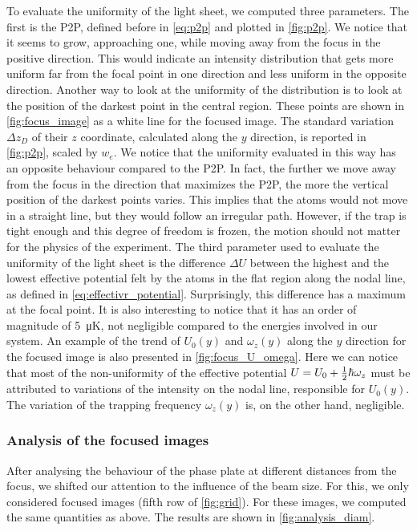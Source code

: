 To evaluate the uniformity of the light sheet, we computed three parameters. The first is the P2P, defined before in \cref{eq:p2p} and plotted in \cref{fig:p2p}. We notice that it seems to grow, approaching one, while moving away from the focus in the positive direction. This would indicate an intensity distribution that gets more uniform far from the focal point in one direction and less uniform in the opposite direction. Another way to look at the uniformity of the distribution is to look at the position of the darkest point in the central region. These points are shown in \cref{fig:focus_image} as a white line for the focused image. The standard variation $\Delta z_D$ of their $z$ coordinate, calculated along the $y$ direction, is reported in \cref{fig:p2p}, scaled by $w_e$. We notice that the uniformity evaluated in this way has an opposite behaviour compared to the P2P. In fact, the further we move away from the focus in the direction that maximizes the P2P, the more the vertical position of the darkest points varies. This implies that the atoms would not move in a straight line, but they would follow an irregular path. However, if the trap is tight enough and this degree of freedom is frozen, the motion should not matter for the physics of the experiment. The third parameter used to evaluate the uniformity of the light sheet is the difference $\Delta U$ between the highest and the lowest effective potential felt by the atoms in the flat region along the nodal line, as defined in \cref{eq:effectivr_potential}. Surprisingly, this difference has a maximum at the focal point. It is also interesting to notice that it has an order of magnitude of \SI{5}{\micro K}, not negligible compared to the energies involved in our system. An example of the trend of $U_0(y)$ and $\omega_z(y)$ along the $y$ direction for the focused image is also presented in \cref{fig:focus_U_omega}. Here we can notice that most of the non-uniformity of the effective potential $U = U_0 + \frac{1}{2} \hbar \omega_z$ must be attributed to variations of the intensity on the nodal line, responsible for $U_0(y)$. The variation of the trapping frequency $\omega_z(y)$ is, on the other hand, negligible.


\subsubsection{Analysis of the focused images}
After analysing the behaviour of the phase plate at different distances from the focus, we shifted our attention to the influence of the beam size. For this, we only considered focused images (fifth row of \cref{fig:grid}). For these images, we computed the same quantities as above.
The results are shown in \cref{fig:analysis_diam}.

